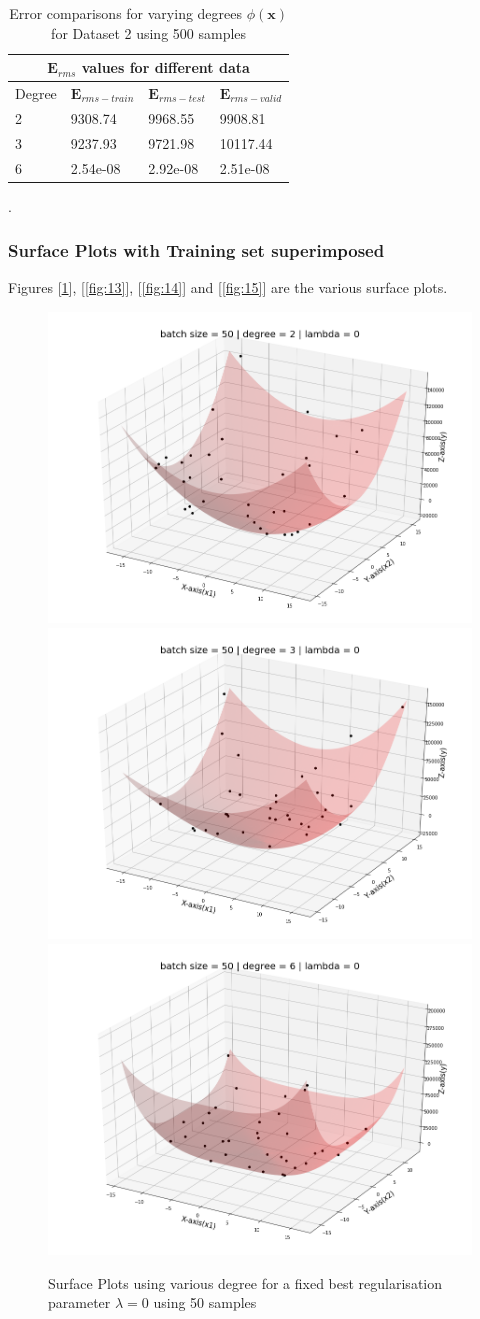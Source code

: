 {\begin{table}[!ht]
\vspace*{\floatsep}
 \begin{tabular}{ |p{1.5cm}|p{3cm}|p{3cm}| p{3cm}|  }
\hline
\multicolumn{4}{|c|}{$\mathbf{E}_{rms}$ values for different data } \\
\hline
\rowcolor{lightgray} Degree & $\mathbf{E}_{rms-train}$ & $\mathbf{E}_{rms-test}$ & $\mathbf{E}_{rms-valid}$ \\
\hline
 2   &   9308.74  &  9968.55 & 9908.81   \\   
 \hline
 3   &   9237.93   &   9721.98  &   10117.44    \\
 \hline
 6   &   2.54e-08   &    2.92e-08     &     2.51e-08  \\
\hline
\end{tabular}
\caption{Error comparisons for varying degrees $\phi(\mathbf{x}) $ for Dataset 2 using 500 samples}.
\label{table:8}
\end{table}
}


\newpage
\subsubsection{Surface Plots with Training set superimposed}
Figures [\ref{fig:12}], [\ref{fig:13}], [\ref{fig:14}] and [\ref{fig:15}] are the various surface plots.

\begin{figure}[!ht]
    \includegraphics[width=.30\textwidth]{Task 2 Images/surfaceplot_batch50_deg2_lamb0.png}\hfill
    \includegraphics[width=.30\textwidth]{Task 2 Images/surfaceplot_batch50_deg3_lamb0.png}\hfill
    \includegraphics[width=.30\textwidth]{Task 2 Images/surfaceplot_batch50_deg6_lamb0.png}
    \caption{Surface Plots using various degree for a fixed best regularisation parameter $\lambda = 0$ using 50 samples }
    \label{fig:12}
\end{figure}

